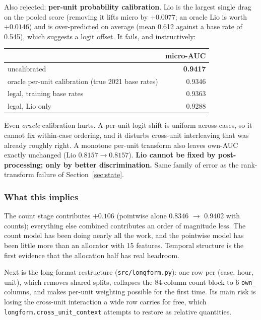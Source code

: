 Also rejected: \textbf{per-unit probability calibration}. Lio is the largest single drag on the
pooled score (removing it lifts micro by $+0.0077$; an oracle Lio is worth $+0.0146$) and is
over-predicted on average (mean 0.612 against a base rate of 0.545), which suggests a logit
offset. It fails, and instructively:

\begin{center}\small
\begin{tabular}{lr}
\toprule
& micro-AUC \\
\midrule
uncalibrated & \textbf{0.9417} \\
oracle per-unit calibration (true 2021 base rates) & 0.9346 \\
legal, training base rates & 0.9363 \\
legal, Lio only & 0.9288 \\
\bottomrule
\end{tabular}
\end{center}

\begin{finding}
Even \emph{oracle} calibration hurts. A per-unit logit shift is uniform across cases, so it
cannot fix within-case ordering, and it disturbs cross-unit interleaving that was already roughly
right. A monotone per-unit transform also leaves own-AUC exactly unchanged (Lio $0.8157 \to
0.8157$). \textbf{Lio cannot be fixed by post-processing; only by better discrimination.} Same
family of error as the rank-transform failure of Section~\ref{sec:state}.
\end{finding}

\subsubsection*{What this implies}

The count stage contributes $+0.106$ (pointwise alone 0.8346 $\to$ 0.9402 with counts); everything
else combined contributes an order of magnitude less. The count model has been doing nearly all
the work, and the pointwise model has been little more than an allocator with 15 features.
Temporal structure is the first evidence that the allocation half has real headroom.

Next is the long-format restructure (\texttt{src/longform.py}): one row per (case, hour, unit),
which removes shared splits, collapses the 84-column count block to 6 \texttt{own\_} columns, and
makes per-unit weighting possible for the first time. Its main risk is losing the cross-unit
interaction a wide row carries for free, which \texttt{longform.cross\_unit\_context} attempts to
restore as relative quantities.
